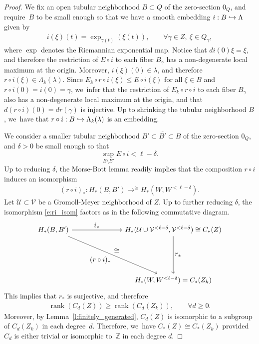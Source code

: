 \documentclass[11pt]{article}
\let\ts\textstyle
\newcommand\hto{\mathrel{\lhook\joinrel\to}}
\newcommand{\Z}{\mathbb{Z}}
\newcommand{\UU}{\mathcal{U}}
\newcommand{\VV}{\mathcal{V}}
\DeclareMathOperator{\rank}{rank}
\DeclareMathOperator*{\toup}{\longrightarrow}
\let\ttoup\toup
\theoremstyle{plain}
\theoremstyle{definition}
\begin{document}
\begin{proof}
We fix an open tubular neighborhood $B\subset Q$ of the zero-section $0_Q$, and require~$B$ to be small enough so that we have a smooth embedding $i:B\hto \Lambda$ given by
\begin{align*}
i(\xi)(t)=\exp_{\gamma(t)}(\xi(t)),\qquad\forall\gamma\in Z,\ \xi\in Q_\gamma,
\end{align*}
where $\exp$ denotes the Riemannian exponential map. Notice that $d i(0)\xi=\xi$, and therefore the restriction of $E\circ i$ to each fiber $B_\gamma$ has a non-degenerate local maximum at the origin.
Moreover, $i(\xi)(0)\in\lambda$, and therefore $r\circ i(\xi)\in\Lambda_k(\lambda)$.
Since $E_k\circ r\circ i(\xi)\leq E\circ i(\xi)$ for all $\xi\in B$ and $r\circ i(0)= i(0)=\gamma$, we~infer that the restriction of $E_k\circ r\circ i$ to each fiber $B_\gamma$ also has a non-degenerate local maximum at the origin, and that $d(r\circ i)(0)=dr(\gamma)$ is injective. Up to shrinking the tubular neighborhood $B$, we~have that $r\circ i:B\hto \Lambda_k(\lambda)$ is an embedding.

We consider a smaller tubular neighborhood $B'\subset \overline{B'}\subset B$ of the zero-section $0_Q$, and $\delta>0$ be small enough so that
\[
\sup_{B\setminus B'} E\circ i<\ell-\delta.
\]
Up to reducing $\delta$, the Morse-Bott lemma \cite[Lem.\,3.51]{Banyaga:2004aa} readily implies that the composition $r\circ i$ induces an isomorphism
\begin{align}
\label{e:ri_isom}
(r\circ i)_*:H_*(B,B')\ttoup^{\cong} H_*(W,W^{<\ell-\delta}).
\end{align}
Let $\UU\subset\VV$ be a Gromoll-Meyer neighborhood of $Z$. Up to further reducing $\delta$, the isomorphism \eqref{e:ri_isom} factors as in the following commutative diagram.
\[
\begin{tikzcd}[row sep=large]
H_*(B,B')
\arrow[rrr, "\ts i_*"]
\arrow[ddrrr, "\ts (r\circ i)_*"', "\ts\cong"]
& & &
H_*(\UU\cup\VV^{<\ell-\delta},\VV^{<\ell-\delta}) \cong C_*(Z)
\arrow[dd,"\ts r_*"]\\\\
& & &
H_*(W,W^{<\ell-\delta})=C_*(Z_k)
\end{tikzcd}
\]
This implies that $r_*$ is surjective, and therefore
\begin{align*}
\rank(C_d(Z))\geq \rank(C_d(Z_k)),\qquad\forall d\geq0.
\end{align*}
Moreover, by Lemma~\ref{l:finitely_generated}, $C_d(Z)$ is isomorphic to a subgroup of $C_d(Z_k)$ in each degree~$d$. Therefore, we~have $C_*(Z)\cong C_*(Z_k)$ provided $C_d$ is either trivial or isomorphic to~$\Z$ in each degree $d$.


\end{proof}
\end{document}
